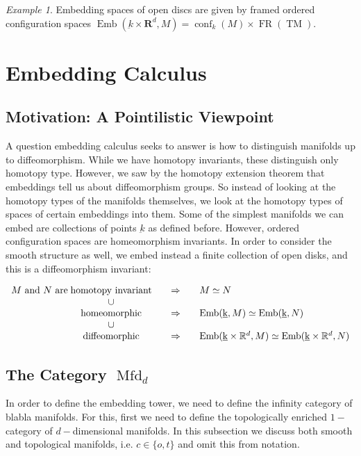 \documentclass{amsart}
\DeclareMathOperator{\Emb}{Emb}
\DeclareMathOperator{\Mfd}{Mfd}
\DeclareMathOperator{\conf}{conf}
\DeclareMathOperator{\FR}{FR}
\DeclareMathOperator{\TM}{TM}
\theoremstyle{definition}
\theoremstyle{remark}
\theoremstyle{example}
\newtheorem{example}[theorem]{Example}
\begin{document}
\begin{example}
    Embedding spaces of open discs are given by framed ordered configuration spaces $\Emb(\underbar{k} \times \mathbf{R}^d, M) = \conf_k(M) \times \FR(\TM)$.
\end{example}

\section{Embedding Calculus}

\subsection{Motivation: A Pointilistic Viewpoint}

A question embedding calculus seeks to answer is how to distinguish manifolds up to diffeomorphism. While we have homotopy invariants, these distinguish only homotopy type. However, we saw by the homotopy extension theorem that embeddings tell us about diffeomorphism groups. So instead of looking at the homotopy types of the manifolds themselves, we look at the homotopy types of spaces of certain embeddings into them. Some of the simplest manifolds we can embed are collections of points $\underbar{k}$ as defined before. However, ordered configuration spaces are homeomorphism invariants. In order to consider the smooth structure as well, we embed instead a finite collection of open disks, and this is a diffeomorphism invariant:



\[
\begin{array}{r@{\;}c@{\qquad}c@{\qquad}l}
    M\text{ and }N\text{ are} & \text{homotopy invariant}
        & \Rightarrow & M \simeq N \\
    & \cup & & \\
    & \text{homeomorphic}
        & \Rightarrow & \Emb(\underbar{k}, M) \simeq \Emb(\underbar{k}, N) \\
    & \cup & & \\
    & \text{diffeomorphic}
        & \Rightarrow & \Emb(\underbar{k} \times \mathbb{R}^d, M) \simeq \Emb(\underbar{k} \times \mathbb{R}^d, N)
\end{array}
\]

\subsection{The Category $\Mfd_d$}

In order to define the embedding tower, we need to define the infinity category of blabla manifolds. For this, first we need to define the topologically enriched $1-$category of $d-$dimensional manifolds. In this subsection we discuss both smooth and topological manifolds, i.e. $c \in \{o, t\}$ and omit this from notation.
\end{document}
